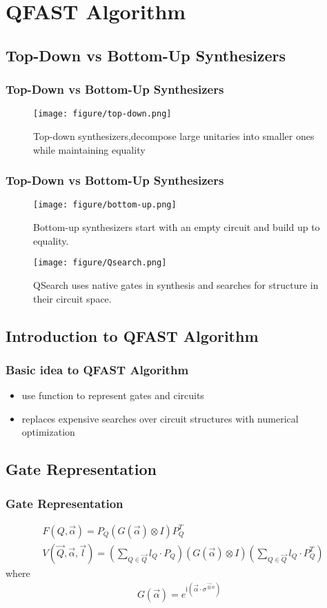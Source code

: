 \section{QFAST Algorithm}

\subsection{Top-Down vs Bottom-Up Synthesizers}
\begin{frame}
\frametitle{Top-Down vs Bottom-Up Synthesizers}
\begin{figure}
  \texttt{[image: figure/top-down.png]}
  \caption{Top-down synthesizers,decompose large unitaries into smaller ones while maintaining equality}
\end{figure}
\end{frame}
\begin{frame}
  \frametitle{Top-Down vs Bottom-Up Synthesizers}
  \begin{figure}
    \texttt{[image: figure/bottom-up.png]}
    \caption{Bottom-up synthesizers start with an empty circuit and build up to equality.}
  \end{figure}
  \begin{figure}
    \texttt{[image: figure/Qsearch.png]}
    \caption{QSearch uses native gates in synthesis and searches for structure in their circuit space.}
  \end{figure}
\end{frame}
\subsection{Introduction to QFAST Algorithm}
\begin{frame}
\frametitle{Basic idea to QFAST Algorithm\cite{QFAST}}
\begin{itemize}
  \item use function to represent gates and circuits
  \item replaces expensive searches over circuit structures with numerical optimization
\end{itemize}
\end{frame}

\subsection{Gate Representation}
\begin{frame}
\frametitle{Gate Representation}

\begin{align}
  &F(Q, \vec{\alpha})=P_{Q}(G(\vec{\alpha}) \otimes I) P_{Q}^{T}\\
  &V(\vec{Q}, \vec{\alpha}, \vec{l})=\left(\sum_{Q \in \vec{Q}} l_{Q} \cdot P_{Q}\right)(G(\vec{\alpha}) \otimes I)\left(\sum_{Q \in \vec{Q}} l_{Q} \cdot P_{Q}^{T}\right)
\end{align}
where
\begin{align}
  G(\vec{\alpha})=e^{\mathrm{i}\left(\vec{\alpha} \cdot \sigma^{\vec{\otimes} n}\right)}
\end{align}
\end{frame}

